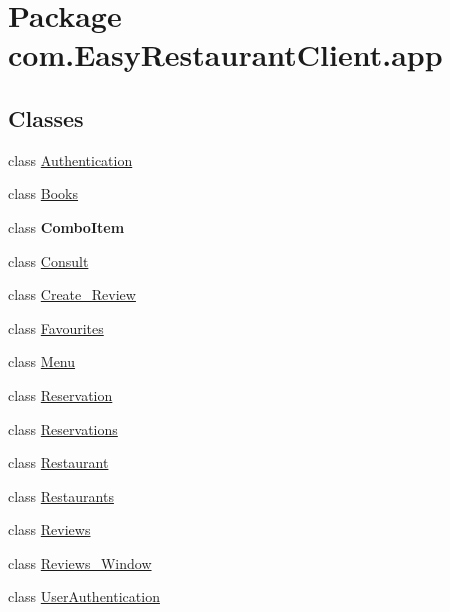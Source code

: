 \hypertarget{namespacecom_1_1_easy_restaurant_client_1_1app}{}\section{Package com.\+Easy\+Restaurant\+Client.\+app}
\label{namespacecom_1_1_easy_restaurant_client_1_1app}
\subsection*{Classes}
\begin{DoxyCompactItemize}
\item 
class \mbox{\hyperlink{classcom_1_1_easy_restaurant_client_1_1app_1_1_authentication}{Authentication}}
\item 
class \mbox{\hyperlink{classcom_1_1_easy_restaurant_client_1_1app_1_1_books}{Books}}
\item 
class {\bfseries Combo\+Item}
\item 
class \mbox{\hyperlink{classcom_1_1_easy_restaurant_client_1_1app_1_1_consult}{Consult}}
\item 
class \mbox{\hyperlink{classcom_1_1_easy_restaurant_client_1_1app_1_1_create___review}{Create\+\_\+\+Review}}
\item 
class \mbox{\hyperlink{classcom_1_1_easy_restaurant_client_1_1app_1_1_favourites}{Favourites}}
\item 
class \mbox{\hyperlink{classcom_1_1_easy_restaurant_client_1_1app_1_1_menu}{Menu}}
\item 
class \mbox{\hyperlink{classcom_1_1_easy_restaurant_client_1_1app_1_1_reservation}{Reservation}}
\item 
class \mbox{\hyperlink{classcom_1_1_easy_restaurant_client_1_1app_1_1_reservations}{Reservations}}
\item 
class \mbox{\hyperlink{classcom_1_1_easy_restaurant_client_1_1app_1_1_restaurant}{Restaurant}}
\item 
class \mbox{\hyperlink{classcom_1_1_easy_restaurant_client_1_1app_1_1_restaurants}{Restaurants}}
\item 
class \mbox{\hyperlink{classcom_1_1_easy_restaurant_client_1_1app_1_1_reviews}{Reviews}}
\item 
class \mbox{\hyperlink{classcom_1_1_easy_restaurant_client_1_1app_1_1_reviews___window}{Reviews\+\_\+\+Window}}
\item 
class \mbox{\hyperlink{classcom_1_1_easy_restaurant_client_1_1app_1_1_user_authentication}{User\+Authentication}}
\end{DoxyCompactItemize}
